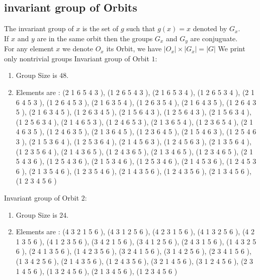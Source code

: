 \documentclass[12pt]{article}
\begin{document}
\subsection{invariant group of Orbits}
\noindent The invariant group of $x$ is the set of $g$ such that $g(x)=x$ denoted by $G_x$.\\
If $x$ and $y$ are in the same orbit then the groups $G_x$ and  $G_y$ are conjuguate.\\
For any element $x$ we denote $O_x$ its Orbit, we have $|O_x|\times |G_x|=|G|$
We print only nontrivial groups
Invariant group of Orbit $1$:
\begin{enumerate}
\item Group Size is $48$.
\item Elements are : (2 1 6 5 4 3  ), (1 2 6 5 4 3  ), (2 1 6 5 3 4  ), (1 2 6 5 3 4  ), (2 1 6 4 5 3  ), (1 2 6 4 5 3  ), (2 1 6 3 5 4  ), (1 2 6 3 5 4  ), (2 1 6 4 3 5  ), (1 2 6 4 3 5  ), (2 1 6 3 4 5  ), (1 2 6 3 4 5  ), (2 1 5 6 4 3  ), (1 2 5 6 4 3  ), (2 1 5 6 3 4  ), (1 2 5 6 3 4  ), (2 1 4 6 5 3  ), (1 2 4 6 5 3  ), (2 1 3 6 5 4  ), (1 2 3 6 5 4  ), (2 1 4 6 3 5  ), (1 2 4 6 3 5  ), (2 1 3 6 4 5  ), (1 2 3 6 4 5  ), (2 1 5 4 6 3  ), (1 2 5 4 6 3  ), (2 1 5 3 6 4  ), (1 2 5 3 6 4  ), (2 1 4 5 6 3  ), (1 2 4 5 6 3  ), (2 1 3 5 6 4  ), (1 2 3 5 6 4  ), (2 1 4 3 6 5  ), (1 2 4 3 6 5  ), (2 1 3 4 6 5  ), (1 2 3 4 6 5  ), (2 1 5 4 3 6  ), (1 2 5 4 3 6  ), (2 1 5 3 4 6  ), (1 2 5 3 4 6  ), (2 1 4 5 3 6  ), (1 2 4 5 3 6  ), (2 1 3 5 4 6  ), (1 2 3 5 4 6  ), (2 1 4 3 5 6  ), (1 2 4 3 5 6  ), (2 1 3 4 5 6  ), (1 2 3 4 5 6  )
\end{enumerate}
Invariant group of Orbit $2$:
\begin{enumerate}
\item Group Size is $24$.
\item Elements are : (4 3 2 1 5 6  ), (4 3 1 2 5 6  ), (4 2 3 1 5 6  ), (4 1 3 2 5 6  ), (4 2 1 3 5 6  ), (4 1 2 3 5 6  ), (3 4 2 1 5 6  ), (3 4 1 2 5 6  ), (2 4 3 1 5 6  ), (1 4 3 2 5 6  ), (2 4 1 3 5 6  ), (1 4 2 3 5 6  ), (3 2 4 1 5 6  ), (3 1 4 2 5 6  ), (2 3 4 1 5 6  ), (1 3 4 2 5 6  ), (2 1 4 3 5 6  ), (1 2 4 3 5 6  ), (3 2 1 4 5 6  ), (3 1 2 4 5 6  ), (2 3 1 4 5 6  ), (1 3 2 4 5 6  ), (2 1 3 4 5 6  ), (1 2 3 4 5 6  )
\end{enumerate}
\end{document}
